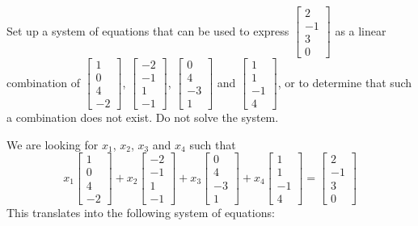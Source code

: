 \documentclass{ximera}
\begin{document}
\begin{example}
Set up a system of equations that can be used to express $\begin{bmatrix}2\\-1\\3\\0\end{bmatrix}$ as a linear combination of $\begin{bmatrix}1\\0\\4\\-2\end{bmatrix}$, $\begin{bmatrix}-2\\-1\\1\\-1\end{bmatrix}$, $\begin{bmatrix}0\\4\\-3\\1\end{bmatrix}$ and $\begin{bmatrix}1\\1\\-1\\4\end{bmatrix}$, or to determine that such a combination does not exist.  Do not solve the system.
\begin{explanation}
We are looking for $x_1$, $x_2$, $x_3$ and $x_4$ such that 
$$x_1\begin{bmatrix}1\\0\\4\\-2\end{bmatrix}+x_2\begin{bmatrix}-2\\-1\\1\\-1\end{bmatrix}+x_3\begin{bmatrix}0\\4\\-3\\1\end{bmatrix}+x_4\begin{bmatrix}1\\1\\-1\\4\end{bmatrix}=\begin{bmatrix}2\\-1\\3\\0\end{bmatrix}$$
This translates into the following system of equations:


\end{explanation}
\end{example}
\end{document}
